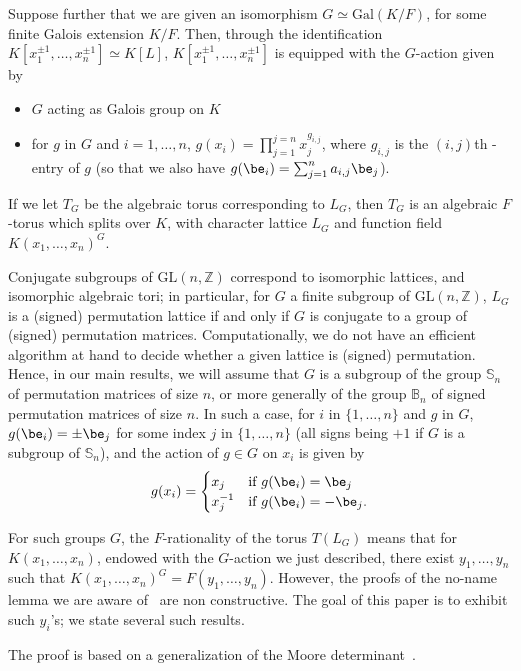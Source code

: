 \documentclass[12pt]{article}
\theoremstyle{plain}
\newcommand{\Z}{\ensuremath{\mathbb{Z}}}
\begin{document}
Suppose further that we are given an isomorphism $G \simeq
\mathrm{Gal}(K/F)$, for some finite Galois extension $K/F$. Then,
through the identification $K[x_1^{\pm 1}, \ldots , x_n^{\pm
    1}]\simeq K[L]$, $K[x_1^{\pm 1}, \ldots , x_n^{\pm 1}]$ is
equipped with the $G$-action given by
\begin{itemize}
\item $G$ acting as Galois group on $K$
\item for $g$ in $G$ and $i=1,\dots,n$, $g(x_i) = \prod_{j=1}^{j=n}
  x_j^{g_{i,j}}$, where $g_{i,j}$ is the $(i,j)$th -entry of $g$
 (so that we also have $g(\be_i) =
  \sum_{j=1}^{n} a_{i,j}\be_j$).
\end{itemize}
If we let $T_G$ be the algebraic torus corresponding to $L_G$, then
$T_G$ is an algebraic $F$-torus which splits over $K$, with character
lattice $L_G$ and function field $K(x_1,\dots,x_n)^G$.

Conjugate subgroups of $\mathrm{GL}(n,\Z)$ correspond to isomorphic
lattices, and isomorphic algebraic tori; in particular, for $G$ a
finite subgroup of $\mathrm{GL}(n,\mathbb{Z})$, $L_G$ is a (signed)
permutation lattice if and only if $G$ is conjugate to a group of
(signed) permutation matrices.  Computationally, we do not have an
efficient algorithm at hand to decide whether a given lattice is
(signed) permutation. Hence, in our main results, we will assume that
$G$ is a subgroup of the group $\mathbb{S}_n$ of permutation matrices
of size $n$, or more generally of the group $\mathbb{B}_n$ of signed
permutation matrices of size $n$.  In such a case, for $i$ in
$\{1,\dots,n\}$ and $g$ in $G$, $g(\be_i)=\pm \be_j$ for some index
$j$ in $\{1,\dots,n\}$ (all signs being $+1$ if $G$ is a subgroup of
$\mathbb{S}_n$), and the action of $g \in G$ on $x_i$ is given
by $$g(x_i) = \begin{cases} x_j & \text{if~} g(\be_i) = \be_j
  \\ x^{-1}_j & \text{if~} g(\be_i) = -\be_j. \end{cases}$$

For such groups $G$, the $F$-rationality of the torus $T(L_G)$ means
that for $K(x_1,\dots,x_n)$, endowed with the $G$-action we just
described, there exist $y_1,\dots,y_n$ such that
$K(x_1,\dots,x_n)^G=F(y_1,\dots,y_n)$. However, the proofs of the
no-name lemma we are aware of~\cite{xxx} are non constructive. 
The goal of this paper is to exhibit such $y_i$'s; we state several 
such results.


The proof is based on a generalization of the Moore
determinant~\cite[Section 1.3]{Goss}.
\end{document}
